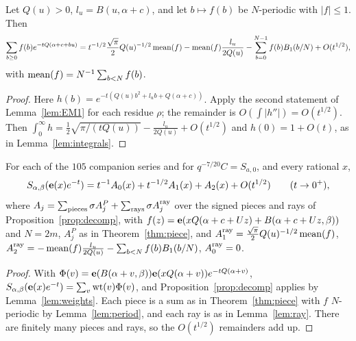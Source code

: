 \begin{lemma}\label{lem:ray}
Let $Q(u)>0$, $l_u=B(u,\alpha+c)$, and let $b\mapsto f(b)$ be $N$-periodic with $|f|\le1$. Then
\[
\sum_{b\ge0}f(b)e^{-tQ(\alpha+c+bu)}=t^{-1/2}\frac{\sqrt\pi}2Q(u)^{-1/2}\operatorname{mean}(f)-\operatorname{mean}(f)\frac{l_u}{2Q(u)}-\sum_{b=0}^{N-1}f(b)B_1(b/N)+O(t^{1/2}),
\]
with $\operatorname{mean}(f)=N^{-1}\sum_{b<N}f(b)$.
\end{lemma}
\begin{proof}
Here $h(b)=e^{-t(Q(u)b^2+l_ub+Q(\alpha+c))}$. Apply the second statement of Lemma~\ref{lem:EM1} for each residue $\rho$; the remainder is
$O(\int|h''|)=O(t^{1/2})$. Then $\int_0^\infty h=\frac12\sqrt{\pi/(tQ(u))}-\frac{l_u}{2Q(u)}+O(t^{1/2})$ and $h(0)=1+O(t)$, as in Lemma~\ref{lem:integrals}.
\end{proof}

\begin{theorem}\label{thm:expansion}
For each of the $105$ companion series and for $q^{-7/20}C=S_{a,0}$, and every rational $x$,
\[
S_{\alpha,\beta}(\mathbf{e}(x)e^{-t})=t^{-1}A_0(x)+t^{-1/2}A_1(x)+A_2(x)+O(t^{1/2})\qquad(t\to0^+),
\]
where $A_j=\sum_{\rm pieces}\sigma A_j^P+\sum_{\rm rays}\sigma A_j^{\rm ray}$ over the signed pieces and rays of Proposition~\ref{prop:decomp}, with
$f(z)=\mathbf{e}(xQ(\alpha+c+Uz)+B(\alpha+c+Uz,\beta))$ and $N=2m$, $A^P_j$ as in Theorem~\ref{thm:piece}, and $A^{\rm ray}_1=\frac{\sqrt\pi}2Q(u)^{-1/2}\operatorname{mean}(f)$,
$A^{\rm ray}_2=-\operatorname{mean}(f)\frac{l_u}{2Q(u)}-\sum_{b<N}f(b)B_1(b/N)$, $A_0^{\rm ray}=0$.
\end{theorem}
\begin{proof}
With $\Phi(v)=\mathbf{e}(B(\alpha+v,\beta))\mathbf{e}(xQ(\alpha+v))e^{-tQ(\alpha+v)}$, $S_{\alpha,\beta}(\mathbf{e}(x)e^{-t})=\sum_v\operatorname{wt}(v)\Phi(v)$, and Proposition~\ref{prop:decomp} applies by
Lemma~\ref{lem:weights}. Each piece is a sum as in Theorem~\ref{thm:piece} with $f$ $N$-periodic by Lemma~\ref{lem:period}, and each ray is as in Lemma~\ref{lem:ray}.
There are finitely many pieces and rays, so the $O(t^{1/2})$ remainders add up.
\end{proof}


